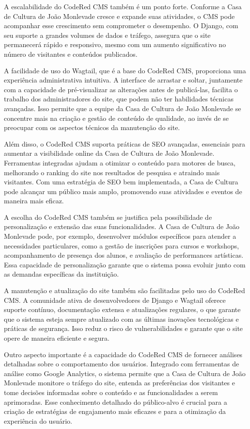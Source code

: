 A escalabilidade do CodeRed CMS também é um ponto forte. Conforme a Casa de Cultura de João Monlevade cresce e expande suas atividades, o CMS pode acompanhar esse crescimento sem comprometer o desempenho. O Django, com seu suporte a grandes volumes de dados e tráfego, assegura que o site permanecerá rápido e responsivo, mesmo com um aumento significativo no número de visitantes e conteúdos publicados.

A facilidade de uso do Wagtail, que é a base do CodeRed CMS, proporciona uma experiência administrativa intuitiva. A interface de arrastar e soltar, juntamente com a capacidade de pré-visualizar as alterações antes de publicá-las, facilita o trabalho dos administradores do site, que podem não ter habilidades técnicas avançadas. Isso permite que a equipe da Casa de Cultura de João Monlevade se concentre mais na criação e gestão de conteúdo de qualidade, ao invés de se preocupar com os aspectos técnicos da manutenção do site.

Além disso, o CodeRed CMS suporta práticas de SEO avançadas, essenciais para aumentar a visibilidade online da Casa de Cultura de João Monlevade. Ferramentas integradas ajudam a otimizar o conteúdo para motores de busca, melhorando o ranking do site nos resultados de pesquisa e atraindo mais visitantes. Com uma estratégia de SEO bem implementada, a Casa de Cultura pode alcançar um público mais amplo, promovendo suas atividades e eventos de maneira mais eficaz.

A escolha do CodeRed CMS também se justifica pela possibilidade de personalização e extensão das suas funcionalidades. A Casa de Cultura de João Monlevade pode, por exemplo, desenvolver módulos específicos para atender a necessidades particulares, como a gestão de inscrições para cursos e workshops, acompanhamento de presença dos alunos, e avaliação de performances artísticas. Essa capacidade de personalização garante que o sistema possa evoluir junto com as demandas específicas da instituição.

A manutenção e atualização do site também são facilitadas pelo uso do CodeRed CMS. A comunidade ativa de desenvolvedores de Django e Wagtail oferece suporte contínuo, documentação extensa e atualizações regulares, o que garante que o sistema esteja sempre atualizado com as últimas inovações tecnológicas e práticas de segurança. Isso reduz o risco de vulnerabilidades e garante que o site opere de maneira eficiente e segura.

Outro aspecto importante é a capacidade do CodeRed CMS de fornecer análises detalhadas sobre o comportamento dos usuários. Integrado com ferramentas de análise como Google Analytics, o sistema permite que a Casa de Cultura de João Monlevade monitore o tráfego do site, entenda as preferências dos visitantes e tome decisões informadas sobre o conteúdo e as funcionalidades a serem aprimoradas. Esse conhecimento detalhado do público-alvo é crucial para a criação de estratégias de engajamento mais eficazes e para a otimização da experiência do usuário.

